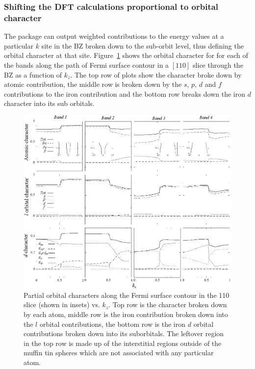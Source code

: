 \subsubsection{Shifting the \ac{DFT} calculations proportional to orbital character}
\label{Sec:ResD:ShiftingDFTPropToOrbitalCharacter}

The \WIEN{} package can output weighted contributions to the energy values at a particular $k$ site in the \ac{BZ} broken down to the sub-orbit level, thus defining the orbital character at that site. Figure~\ref{Fig:ResD:Band2DCharacterVsKz} shows the orbital character for for each of the bands along the path of Fermi surface contour in a $[110]$ slice through the \BaFeP{} \ac{BZ} as a function of $k_z$. The top row of plots show the character broke down by atomic contribution, the middle row is broken down by the $s$, $p$, $d$ and $f$ contributions to the iron contribution and the bottom row breaks down the iron $d$ character into its sub orbitals.
\begin{figure}[htbp]
    \begin{center}
        \includegraphics[scale=1.15]{Chapter-dHvABaFe2P2/Figures/AngleDepMeasurements/BandCharacterVsKz/AllBandCharacterVsKz}
        \caption{Partial orbital characters along the Fermi surface contour in the 110 slice (shown in insets) vs. $k_z$. Top row is the character broken down by each atom, middle row is the iron contribution broken down into the $l$ orbital contributions, the bottom row is the iron $d$ orbital contributions broken down into its suborbitals. The leftover region in the top row is made up of the interstitial regions outside of the muffin tin spheres which are not associated with any particular atom.}
        \label{Fig:ResD:Band2DCharacterVsKz}
    \end{center}
\end{figure}

